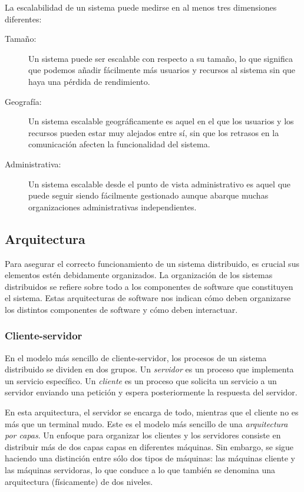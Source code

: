 \documentclass[conference,compsoc]{IEEEtran}
\begin{document}
\begin{samepage}
La escalabilidad de un sistema puede medirse en al menos tres dimensiones diferentes\cite{neuman1994scale}:

\begin{description}
    \item[Tamaño:] Un sistema puede ser escalable con respecto a su tamaño, lo que significa que podemos añadir fácilmente más usuarios y recursos al sistema sin que haya una pérdida de rendimiento.
    \item[Geografía:] Un sistema escalable geográficamente es aquel en el que los usuarios y los recursos pueden estar muy alejados entre sí, sin que los retrasos en la comunicación afecten la funcionalidad del sistema.
    \item[Administrativa:] Un sistema escalable desde el punto de vista administrativo es aquel que puede seguir siendo fácilmente gestionado aunque abarque muchas organizaciones administrativas independientes.
\end{description}
\end{samepage}

\subsection{Arquitectura}

Para asegurar el correcto funcionamiento de un sistema distribuido, es crucial sus elementos estén debidamente organizados. La organización de los sistemas distribuidos se refiere sobre todo a los componentes de software que constituyen el sistema. Estas arquitecturas de software nos indican cómo deben organizarse los distintos componentes de software y cómo deben interactuar.\cite{steen_tanenbaum_2017}

\subsubsection{Cliente-servidor}

En el modelo más sencillo de cliente-servidor, los procesos de un sistema distribuido se dividen en dos grupos. Un \emph{servidor} es un proceso que implementa un servicio específico. Un \emph{cliente} es un proceso que solicita un servicio a un servidor enviando una petición y espera posteriormente la respuesta del servidor\cite{steen_tanenbaum_2017}.

En esta arquitectura, el servidor se encarga de todo, mientras que el cliente no es más que un terminal mudo. Este es el modelo más sencillo de una \emph{arquitectura por capas}. Un enfoque para organizar los clientes y los servidores consiste en distribuir más de dos capas capas en diferentes máquinas. Sin embargo, se sigue haciendo una distinción entre sólo dos tipos de máquinas: las máquinas cliente y las máquinas servidoras, lo que conduce a lo que también se denomina una arquitectura (físicamente) de dos niveles\cite{steen_tanenbaum_2017}.
\end{document}

